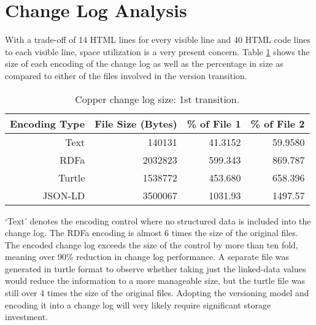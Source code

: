 \section{Change Log Analysis}

With a trade-off of 14 HTML lines for every visible line and 40 HTML code lines to each visible line, space utilization is a very present concern.
Table \ref{table:Cu_changelog_table1} shows the size of each encoding of the change log as well as the percentage in size as compared to either of the files involved in the version transition.
\begin{table}
	\caption{Copper change log size: 1st transition.}
	\label{table:Cu_changelog_table1}
	\centering
	\begin{tabular}{@{}rrrr@{}}
		\toprule
		Encoding Type & File Size (Bytes) & \% of File 1 & \% of File 2 \\
		\midrule
		Text&	140131&	41.3152&	59.9580\\
		RDFa&	2032823&	599.343&	869.787\\
		Turtle&	1538772&	453.680&	658.396\\
		JSON-LD&	3500067&	1031.93&	1497.57\\
		\bottomrule
	\end{tabular}
\end{table}
`Text' denotes the encoding control where no structured data is included into the change log.
The RDFa encoding is almost 6 times the size of the original files.
The encoded change log exceeds the size of the control by more than ten fold, meaning over 90\% reduction in change log performance.
A separate file was generated in turtle format to observe whether taking just the linked-data values would reduce the information to a more manageable size, but the turtle file was still over 4 times the size of the original files.
Adopting the versioning model and encoding it into a change log will very likely require significant storage investment.


